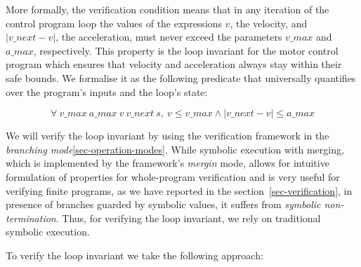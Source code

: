 More formally, the verification condition means
that in any iteration of the control program loop the values of the
expressions $v$, the velocity, and $\left| v\_next - v \right|$,
the acceleration, must never exceed the parameters $v\_max$ and $a\_max$, respectively.
This property is the loop invariant for the motor control program which
ensures that velocity and acceleration always stay within their safe bounds. We
formalise it as the following predicate that universally quantifies over the
program's inputs and the loop's state:

\begin{tcolorbox}
\LARGE{
\[
  \forall\ v\_max\ a\_max\ v\ v\_next\ s,
  \ v \leq v\_max \land \left| v\_next - v \right| \leq a\_max
\]}
\end{tcolorbox}

\noindent
We will verify the loop invariant by using the verification framework in the
\emph{branching mode}\ref{sec-operation-modes}. While symbolic execution with
merging, which is implemented by the framework's \emph{mergin} mode, allows
for intuitive formulation of properties for whole-program verification and
is very useful for verifying finite programs, as we have
reported in the section~\ref{sec-verification}, in presence of branches guarded
by symbolic values, it suffers from \emph{symbolic non-termination}.
Thus, for verifying the loop invariant, we rely on traditional symbolic execution.

To verify the loop invariant we take the following approach:

